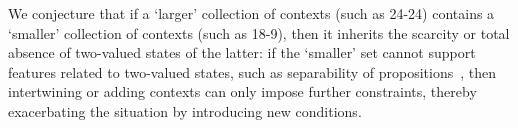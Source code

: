 \documentclass[
  twocolumn,
 showpacs,
 showkeys,
 preprintnumbers,
 amsmath,amssymb,
 aps,
 pra,
  longbibliography,
 floatfix,
 ]{revtex4-2}
\begin{document}
We conjecture that if a `larger' collection of contexts (such as 24-24) contains a `smaller' collection of contexts (such as 18-9),
then it inherits the scarcity or total absence of two-valued states of the latter: if the `smaller' set cannot support features related to two-valued states, such as separability of propositions~\cite[Theorem 0]{kochen1},
then intertwining or adding contexts can only impose further constraints, thereby exacerbating the situation by introducing new conditions.



\end{document}
